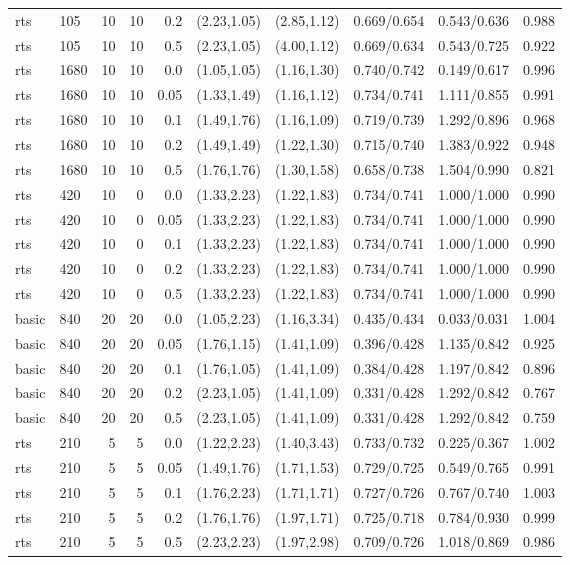 \begin{tabular}{llrrrccccc}
rts & 105 & 10 & 10 & 0.2 & (2.23,1.05) & (2.85,1.12) & 0.669/0.654 & 0.543/0.636 & 0.988 \\
rts & 105 & 10 & 10 & 0.5 & (2.23,1.05) & (4.00,1.12) & 0.669/0.634 & 0.543/0.725 & 0.922 \\
rts & 1680 & 10 & 10 & 0.0 & (1.05,1.05) & (1.16,1.30) & 0.740/0.742 & 0.149/0.617 & 0.996 \\
rts & 1680 & 10 & 10 & 0.05 & (1.33,1.49) & (1.16,1.12) & 0.734/0.741 & 1.111/0.855 & 0.991 \\
rts & 1680 & 10 & 10 & 0.1 & (1.49,1.76) & (1.16,1.09) & 0.719/0.739 & 1.292/0.896 & 0.968 \\
rts & 1680 & 10 & 10 & 0.2 & (1.49,1.49) & (1.22,1.30) & 0.715/0.740 & 1.383/0.922 & 0.948 \\
rts & 1680 & 10 & 10 & 0.5 & (1.76,1.76) & (1.30,1.58) & 0.658/0.738 & 1.504/0.990 & 0.821 \\
rts & 420 & 10 & 0 & 0.0 & (1.33,2.23) & (1.22,1.83) & 0.734/0.741 & 1.000/1.000 & 0.990 \\
rts & 420 & 10 & 0 & 0.05 & (1.33,2.23) & (1.22,1.83) & 0.734/0.741 & 1.000/1.000 & 0.990 \\
rts & 420 & 10 & 0 & 0.1 & (1.33,2.23) & (1.22,1.83) & 0.734/0.741 & 1.000/1.000 & 0.990 \\
rts & 420 & 10 & 0 & 0.2 & (1.33,2.23) & (1.22,1.83) & 0.734/0.741 & 1.000/1.000 & 0.990 \\
rts & 420 & 10 & 0 & 0.5 & (1.33,2.23) & (1.22,1.83) & 0.734/0.741 & 1.000/1.000 & 0.990 \\
basic & 840 & 20 & 20 & 0.0 & (1.05,2.23) & (1.16,3.34) & 0.435/0.434 & 0.033/0.031 & 1.004 \\
basic & 840 & 20 & 20 & 0.05 & (1.76,1.15) & (1.41,1.09) & 0.396/0.428 & 1.135/0.842 & 0.925 \\
basic & 840 & 20 & 20 & 0.1 & (1.76,1.05) & (1.41,1.09) & 0.384/0.428 & 1.197/0.842 & 0.896 \\
basic & 840 & 20 & 20 & 0.2 & (2.23,1.05) & (1.41,1.09) & 0.331/0.428 & 1.292/0.842 & 0.767 \\
basic & 840 & 20 & 20 & 0.5 & (2.23,1.05) & (1.41,1.09) & 0.331/0.428 & 1.292/0.842 & 0.759 \\
rts & 210 & 5 & 5 & 0.0 & (1.22,2.23) & (1.40,3.43) & 0.733/0.732 & 0.225/0.367 & 1.002 \\
rts & 210 & 5 & 5 & 0.05 & (1.49,1.76) & (1.71,1.53) & 0.729/0.725 & 0.549/0.765 & 0.991 \\
rts & 210 & 5 & 5 & 0.1 & (1.76,2.23) & (1.71,1.71) & 0.727/0.726 & 0.767/0.740 & 1.003 \\
rts & 210 & 5 & 5 & 0.2 & (1.76,1.76) & (1.97,1.71) & 0.725/0.718 & 0.784/0.930 & 0.999 \\
rts & 210 & 5 & 5 & 0.5 & (2.23,2.23) & (1.97,2.98) & 0.709/0.726 & 1.018/0.869 & 0.986 \\
\hline
\end{tabular}
